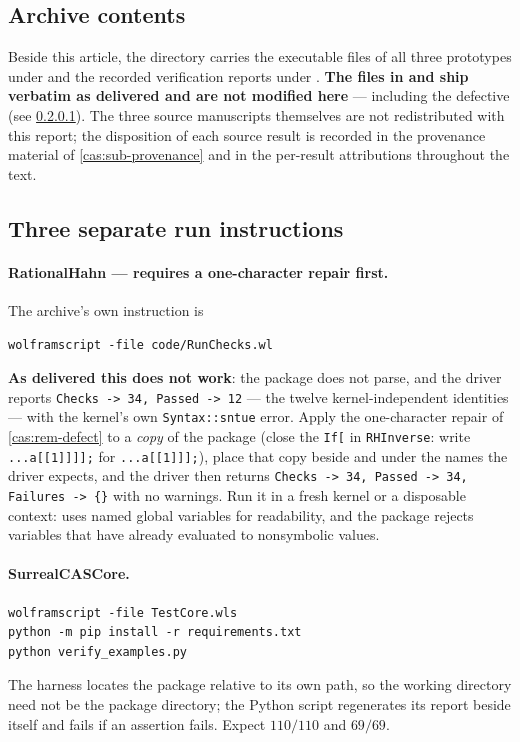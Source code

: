\documentclass[11pt,letterpaper]{article}
\numberwithin{equation}{section}
\theoremstyle{definition}
\theoremstyle{remark}
\begin{document}
\subsection{Archive contents}
\label{cas:app-contents}
Beside this article, the directory carries the executable files of all three
prototypes under  and the recorded verification reports under
. \textbf{The files in  and
 ship verbatim as delivered and are not modified here} --- including
the defective  (see \cref{cas:app-defectnote}). The three
source manuscripts themselves are not redistributed with this report; the
disposition of each source result is recorded in the provenance material of
\cref{cas:sub-provenance} and in the per-result attributions throughout the
text.

\subsection{Three separate run instructions}
\label{cas:app-runs}

\paragraph{RationalHahn --- requires a one-character repair first.}
\label{cas:app-defectnote}
The archive's own instruction is
\begin{lstlisting}
wolframscript -file code/RunChecks.wl
\end{lstlisting}
\textbf{As delivered this does not work}: the package does not parse, and the
driver reports \texttt{Checks -> 34, Passed -> 12} --- the twelve
kernel-independent identities --- with the kernel's own
\texttt{Syntax::sntue} error. Apply the one-character repair of
\cref{cas:rem-defect} to a \emph{copy} of the package (close the \texttt{If[} in
\texttt{RHInverse}: write \texttt{...a[[1]]]];} for \texttt{...a[[1]]];}), place
that copy beside  and  under the names the
driver expects, and the driver then returns \texttt{Checks -> 34, Passed -> 34,
Failures -> \{\}} with no warnings. Run it in a fresh kernel or a disposable
context:  uses named global variables for readability, and the
package rejects variables that have already evaluated to nonsymbolic values.

\paragraph{SurrealCASCore.}
\begin{lstlisting}
wolframscript -file TestCore.wls
python -m pip install -r requirements.txt
python verify_examples.py
\end{lstlisting}
The harness locates the package relative to its own path, so the working
directory need not be the package directory; the Python script regenerates its
report beside itself and fails if an assertion fails. Expect $110/110$ and
$69/69$.
\end{document}
